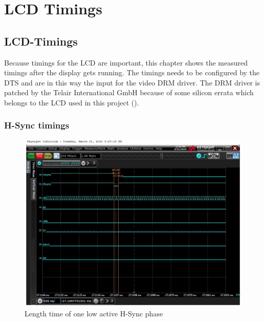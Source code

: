 \chapter{LCD Timings}%
\label{cha:XXXX}

\section{LCD-Timings}%
\label{sec:LCD-Timings}

Because timings for the LCD are important, this chapter shows the measured
timings after the display gets running. The timings needs to be configured by
the \gls{DTS} and are in this way the input for the video DRM driver. The
DRM driver is patched by the Telair International GmbH because of some silicon
errata which belongs to the LCD used in this project (\cite{TI_am335x_errata}).


\subsection{H-Sync timings}%
\label{sub:H-Sync timings}


\begin{figure}[ht]
\begin{center}
    \includegraphics[width=13cm]{pictures/lcd_timings/hsync_length.jpg}
\end{center}
\caption{Length time of one low active H-Sync phase}
\label{fig:hsync_active_time}
\end{figure}



